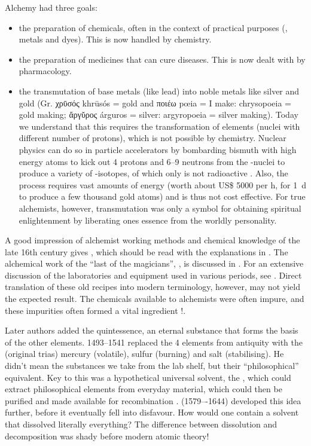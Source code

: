 \documentclass[british,final,landscape]{scrartcl}
\begin{document}
\begin{refsection}
Alchemy had three goals:
\begin{itemize}
  \item{the preparation of chemicals, often in the context of practical purposes (, metals and dyes). This is now handled by chemistry.}
  \item{the preparation of medicines that can cure diseases. This is now dealt with by pharmacology.}
  \item{the transmutation of base metals (like lead) into noble metals like silver and gold (Gr. \foreignlanguage{greek}{χρῡσός} khrūsós = gold and \foreignlanguage{greek}{ποιέω} pœia = I make: chrysopoeia = gold making; \foreignlanguage{greek}{ἄργῠρος} árguros = silver: argyropoeia = silver making). Today we understand that this requires the transformation of elements (nuclei with different number of protons), which is not possible by chemistry. Nuclear physics can do so in particle accelerators by bombarding bismuth with high energy atoms to kick out \num{4} protons and \num{6}--\num{9} neutrons from the -nuclei to produce a variety of -isotopes, of which only  is not radioactive \parencite{Ale-81}. Also, the process requires vast amounts of energy (worth about US\$ \num{5000} per \si{h}, for \SI{1}{d} to produce a few thousand gold atoms) and is thus not cost effective. For true alchemists, however, transmutation was only a symbol for obtaining spiritual enlightenment by liberating ones essence from the worldly personality.}
\end{itemize}
A good impression of alchemist working methods and chemical knowledge of the late 16th century gives \parencite{Rei-96}, which should be read with the explanations in \parencite{Sou-22}. The alchemical work of the ``last of the magicians'', , is discussed in \parencite{New-18}. For an extensive discussion of the laboratories and equipment used in various periods, see \parencite{Mor-21}. Direct translation of these old recipes into modern terminology, however, may not yield the expected result. The chemicals available to alchemists were often impure, and these impurities often formed a vital ingredient \parencite{Pri-87}!.

Later authors added the quintessence, an eternal substance that forms the basis of the other elements.  \num{1493}--\num{1541} \parencite{Mic-21} replaced the 4 elements from antiquity with the  (original trias) mercury (volatile), sulfur (burning) and salt (stabilising). He didn't mean the substances we take from the lab shelf, but their ``philosophical'' equivalent. Key to this was a hypothetical universal solvent, the , which could extract philosophical elements from everyday material, which could then be purified and made available for recombination \parencite{Por-02}.  (\num{1579}–-\num{1644}) developed this idea further, before it eventually fell into disfavour. How would one contain a solvent that dissolved literally everything? The difference between dissolution and decomposition was shady before modern atomic theory!


\end{refsection}
\end{document}
